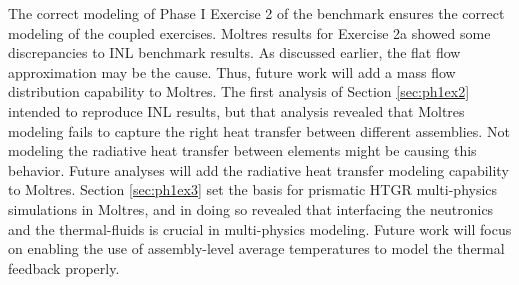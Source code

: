 The correct modeling of Phase I Exercise 2 of the benchmark ensures the correct modeling of the coupled exercises.
Moltres results for Exercise 2a showed some discrepancies to INL benchmark results.
As discussed earlier, the flat flow approximation may be the cause.
Thus, future work will add a mass flow distribution capability to Moltres.
The first analysis of Section \ref{sec:ph1ex2} intended to reproduce INL results, but that analysis revealed that Moltres modeling fails to capture the right heat transfer between different assemblies.
Not modeling the radiative heat transfer between elements might be causing this behavior.
Future analyses will add the radiative heat transfer modeling capability to Moltres.
Section \ref{sec:ph1ex3} set the basis for prismatic HTGR multi-physics simulations in Moltres, and in doing so revealed that interfacing the neutronics and the thermal-fluids is crucial in multi-physics modeling.
Future work will focus on enabling the use of assembly-level average temperatures to model the thermal feedback properly.



